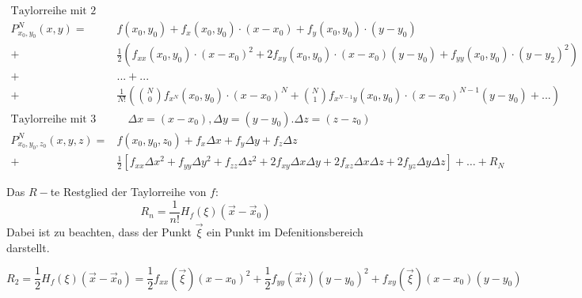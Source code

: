 \documentclass[a4paper]{article}
\begin{document}
		\begin{falgo}
			\begin{align*}
				\text{Taylorreihe mit 2 Variabeln} &\\
				P_{x_0, y_0}^N (x,y) = &f(x_0, y_0) + f_x(x_0, y_0) \cdot (x-x_0) + f_y(x_0, y_0) \cdot (y - y_0)\\
									+ &\frac{1}{2} \left( f_{xx}(x_0, y_0) \cdot (x - x_0)^2 + 2f_{xy}(x_0, y_0) \cdot (x-x_0)(y-y_0) + f_{yy}(x_0, y_0) \cdot (y-y_2)^2 \right)\\
									+ & ... + ...\\
									+ &\frac{1}{N!} \left( \binom{N}{0} f_{x^N}(x_0, y_0) \cdot (x - x_0)^N + \binom{N}{1} f_{x^{N-1}y}(x_0, y_0) \cdot (x-x_0)^{N-1} (y-y_0) + ... \right)\\
				\text{Taylorreihe mit 3 Variabeln} &\quad \Delta x = (x - x_0), \Delta y = (y - y_0). \Delta z = (z - z_0)\\ %
				P_{x_0,y_0,z_0}^N (x,y,z) = &f(x_0,y_0,z_0)+f_x\Delta x+f_y\Delta y+f_z\Delta z\\
									+ &\frac{1}{2}[f_{xx}\Delta x^2+f_{yy}\Delta y^2+f_{zz}\Delta z^2+2f_{xy}\Delta x\Delta y+2f_{xz}\Delta x\Delta z+2f_{yz}\Delta y \Delta z]+\ldots+R_N
			\end{align*}
		\end{falgo}	
		
		\begin{fdef}
			Das $R-$te Restglied der Taylorreihe von $f$:
			$$R_n= \frac{1}{n!}H_f(\xi)(\vec x - \vec x_0)$$
			Dabei ist zu beachten, dass der Punkt $\vec \xi$ ein Punkt im Defenitionsbereich darstellt.
		\end{fdef}
		
		\begin{falgo}
			$$R_2 = \frac{1}{2}H_f(\xi)(\vec x - \vec x_0) = \frac{1}{2}f_{xx}(\vec \xi)(x-x_0)^2 + \frac{1}{2}f_{yy}(\vec xi)(y-y_0)^2+f_{xy}(\vec \xi)(x-x_0)(y-y_0)$$
			
		\end{falgo}
		
\end{document}
